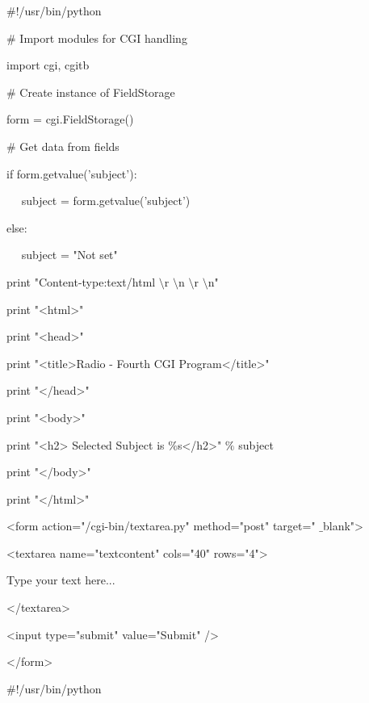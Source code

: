 \begin {enumerate}
\begin {enumerate}
 $  \#  $!/usr/bin/python \par
\vspace{12pt}
\noindent
 $  \#  $ Import modules for CGI handling  \par
\noindent
import cgi, cgitb  \par
\vspace{12pt}
\noindent
 $  \#  $ Create instance of FieldStorage  \par
\noindent
form = cgi.FieldStorage()  \par
\vspace{12pt}
\noindent
 $  \#  $ Get data from fields \par
\noindent
if form.getvalue('subject'): \par
\noindent
~~ subject = form.getvalue('subject') \par
\noindent
else: \par
\noindent
~~ subject = "Not set" \par
\vspace{12pt}
\noindent
print "Content-type:text/html $  \setminus  $r $  \setminus  $n $  \setminus  $r $  \setminus  $n" \par
\noindent
print "<html>" \par
\noindent
print "<head>" \par
\noindent
print "<title>Radio - Fourth CGI Program</title>" \par
\noindent
print "</head>" \par
\noindent
print "<body>" \par
\noindent
print "<h2> Selected Subject is  $  \%  $s</h2>"  $  \%  $ subject \par
\noindent
print "</body>" \par
\noindent
print "</html>" \par
\vspace{12pt}
\noindent
<form action="/cgi-bin/textarea.py" method="post" target=" $  \_  $blank"> \par
\noindent
<textarea name="textcontent" cols="40" rows="4"> \par
\noindent
Type your text here... \par
\noindent
</textarea> \par
\noindent
<input type="submit" value="Submit" /> \par
\noindent
</form> \par
\vspace{12pt}
\noindent
 $  \#  $!/usr/bin/python \par
\vspace{12pt}

\end{enumerate}
\end{enumerate}
